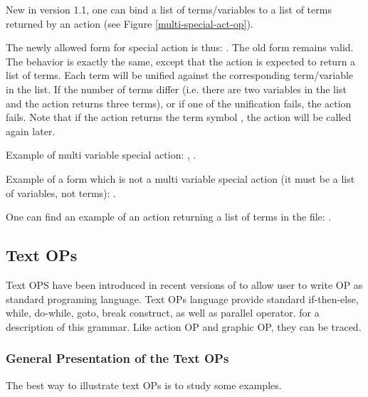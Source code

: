 
New in version 1.1, one can bind a list of terms/variables to a list of
terms returned by an action (see Figure \ref{multi-special-act-op}).

The newly allowed form for special action is thus: \*
.\*
The old form remains valid. The behavior is exactly the same, except that
the action is expected to return a list of terms. Each term will be
unified against the corresponding term/variable in the list. If the number
of terms differ (i.e. there are two variables in the list and the action
returns three terms), or if one of the unification fails, the action
fails. Note that if the action returns the term symbol , the
action will be called again later.

Example of multi variable special action:\*
,\*
.

Example of a form which is not a multi variable special action (it must be a
list of variables, not terms):\*
.

One can find an example of an action returning a list of terms in the
file: .

\subsection{Text OPs}

Text OPS have been introduced in recent versions of \COPRS{} to allow user to
write OP as standard programing language. Text OPs language provide standard
if-then-else, while, do-while, goto, break construct, as well as parallel
operator.   for a
description of this grammar. Like action OP and graphic OP, they can be traced.



\subsubsection{General Presentation of the Text OPs}

The best way to illustrate text OPs is to study some examples.


